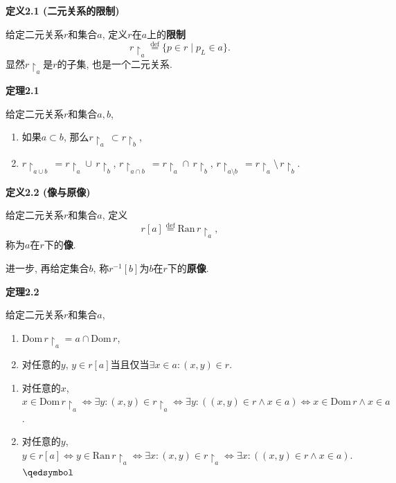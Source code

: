 \documentclass[UTF8]{ctexart}
\begin{document}
\hypertarget{sec:定义2.1}{}
\noindent\textbf{定义2.1 (二元关系的限制)}

给定二元关系$r$和集合$a$, 定义$r$在$a$上的\textbf{限制}
\[
    r\!\restriction_a\overset{\mathrm{def}}{=}\{p\in r\mid p_L\in a\}.
\]
显然$r\!\restriction_a$是$r$的子集, 也是一个二元关系.

\vspace{10pt}

\hypertarget{sec:定理2.1}{}
\noindent\textbf{定理2.1}

给定二元关系$r$和集合$a,b$,
\begin{enumerate}
    \item 如果$a\subset b$, 那么$r\!\restriction_a\,\subset r\!\restriction_b$,
    \item $r\!\restriction_{a\cup b}\,=r\!\restriction_a\cup\,r\!\restriction_b$,
    $r\!\restriction_{a\cap b}\,=r\!\restriction_a\cap\,r\!\restriction_b$,
    $r\!\restriction_{a\setminus b}\,=r\!\restriction_a\setminus\,r\!\restriction_b$.
\end{enumerate}

\vspace{10pt}

\hypertarget{sec:定义2.2}{}
\noindent\textbf{定义2.2 (像与原像)}

给定二元关系$r$和集合$a$, 定义
\[
    r[a]\overset{\mathrm{def}}{=}\mathrm{Ran}\,r\!\restriction_a,
\]
称为$a$在$r$下的\textbf{像}.

进一步, 再给定集合$b$, 称$r^{-1}[b]$为$b$在$r$下的\textbf{原像}.

\vspace{10pt}

\hypertarget{sec:定理2.2}{}
\noindent\textbf{定理2.2}

给定二元关系$r$和集合$a$,
\begin{enumerate}
    \item $\mathrm{Dom}\,r\!\restriction_a=a\cap\mathrm{Dom}\,r$,
    \item 对任意的$y$, $y\in r[a]$当且仅当$\exists x\in a:(x,y)\in r$.
\end{enumerate}


\begin{enumerate}
    \item 对任意的$x$, $x\in\mathrm{Dom}\,r\!\restriction_a\iff
    \exists y:(x,y)\in r\!\restriction_a\iff
    \exists y:((x,y)\in r\land x\in a)\iff x\in\mathrm{Dom}\,r\land x\in a$.
    \item 对任意的$y$, $y\in r[a]\iff y\in\mathrm{Ran}\,r\!\restriction_a\iff
    \exists x:(x,y)\in r\!\restriction_a\iff\exists x:((x,y)\in r\land x\in a)$.
    \hfill $\qedsymbol$
\end{enumerate}
\end{document}
